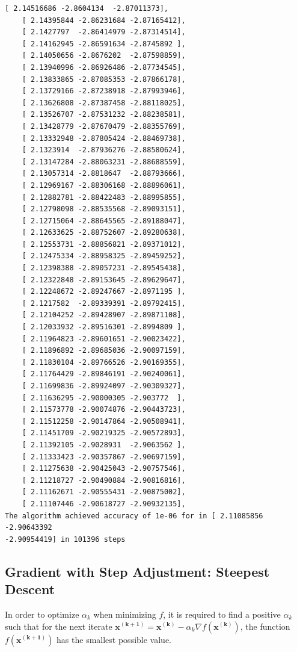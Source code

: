 \documentclass[11pt]{article}
\begin{document}
\begin{Verbatim}[commandchars=\\\{\}]
    [ 2.14516686 -2.8604134  -2.87011373],
    [ 2.14395844 -2.86231684 -2.87165412],
    [ 2.1427797  -2.86414979 -2.87314514],
    [ 2.14162945 -2.86591634 -2.8745892 ],
    [ 2.14050656 -2.8676202  -2.87598859],
    [ 2.13940996 -2.86926486 -2.87734545],
    [ 2.13833865 -2.87085353 -2.87866178],
    [ 2.13729166 -2.87238918 -2.87993946],
    [ 2.13626808 -2.87387458 -2.88118025],
    [ 2.13526707 -2.87531232 -2.88238581],
    [ 2.13428779 -2.87670479 -2.88355769],
    [ 2.13332948 -2.87805424 -2.88469738],
    [ 2.1323914  -2.87936276 -2.88580624],
    [ 2.13147284 -2.88063231 -2.88688559],
    [ 2.13057314 -2.8818647  -2.88793666],
    [ 2.12969167 -2.88306168 -2.88896061],
    [ 2.12882781 -2.88422483 -2.88995855],
    [ 2.12798098 -2.88535568 -2.89093151],
    [ 2.12715064 -2.88645565 -2.89188047],
    [ 2.12633625 -2.88752607 -2.89280638],
    [ 2.12553731 -2.88856821 -2.89371012],
    [ 2.12475334 -2.88958325 -2.89459252],
    [ 2.12398388 -2.89057231 -2.89545438],
    [ 2.12322848 -2.89153645 -2.89629647],
    [ 2.12248672 -2.89247667 -2.8971195 ],
    [ 2.1217582  -2.89339391 -2.89792415],
    [ 2.12104252 -2.89428907 -2.89871108],
    [ 2.12033932 -2.89516301 -2.8994809 ],
    [ 2.11964823 -2.89601651 -2.90023422],
    [ 2.11896892 -2.89685036 -2.90097159],
    [ 2.11830104 -2.89766526 -2.90169355],
    [ 2.11764429 -2.89846191 -2.90240061],
    [ 2.11699836 -2.89924097 -2.90309327],
    [ 2.11636295 -2.90000305 -2.903772  ],
    [ 2.11573778 -2.90074876 -2.90443723],
    [ 2.11512258 -2.90147864 -2.90508941],
    [ 2.11451709 -2.90219325 -2.90572893],
    [ 2.11392105 -2.9028931  -2.9063562 ],
    [ 2.11333423 -2.90357867 -2.90697159],
    [ 2.11275638 -2.90425043 -2.90757546],
    [ 2.11218727 -2.90490884 -2.90816816],
    [ 2.11162671 -2.90555431 -2.90875002],
    [ 2.11107446 -2.90618727 -2.90932135],
The algorithm achieved accuracy of 1e-06 for in [ 2.11085856 -2.90643392
-2.90954419] in 101396 steps
    \end{Verbatim}

    \subsection{Gradient with Step Adjustment: Steepest
Descent}\label{gradient-with-step-adjustment-steepest-descent}

In order to optimize \(\alpha_k\) when minimizing \(f\), it is required
to find a positive \(\alpha_k\) such that for the next iterate
\(\pmb{x^{(k+1)}} = \pmb{x^{(k)}} - \alpha_k \nabla f(\pmb{x^{(k)}})\),
the function \(f(\pmb{x^{(k+1)}})\) has the smallest possible value.
\end{document}
